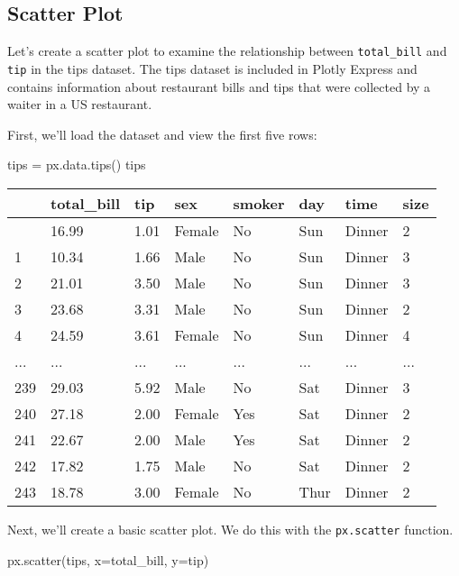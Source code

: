 \documentclass[
  letterpaper,
  DIV=11,
  numbers=noendperiod]{scrreprt}
\newenvironment{Shaded}{\begin{snugshade}}{\end{snugshade}}
\newcommand{\NormalTok}[1]{\textcolor[rgb]{0.00,0.23,0.31}{#1}}
\newcommand{\OperatorTok}[1]{\textcolor[rgb]{0.37,0.37,0.37}{#1}}
\newcommand{\StringTok}[1]{\textcolor[rgb]{0.13,0.47,0.30}{#1}}
\begin{document}
\subsection{Scatter Plot}\label{scatter-plot}

Let's create a scatter plot to examine the relationship between
\texttt{total\_bill} and \texttt{tip} in the tips dataset. The tips
dataset is included in Plotly Express and contains information about
restaurant bills and tips that were collected by a waiter in a US
restaurant.

First, we'll load the dataset and view the first five rows:

\begin{Shaded}
\begin{Highlighting}[]
\NormalTok{tips }\OperatorTok{=}\NormalTok{ px.data.tips()}
\NormalTok{tips}
\end{Highlighting}
\end{Shaded}

\begin{longtable}[]{@{}llllllll@{}}
\toprule\noalign{}
& total\_bill & tip & sex & smoker & day & time & size \\
\midrule\noalign{}
\endhead
\bottomrule\noalign{}
\endlastfoot
0 & 16.99 & 1.01 & Female & No & Sun & Dinner & 2 \\
1 & 10.34 & 1.66 & Male & No & Sun & Dinner & 3 \\
2 & 21.01 & 3.50 & Male & No & Sun & Dinner & 3 \\
3 & 23.68 & 3.31 & Male & No & Sun & Dinner & 2 \\
4 & 24.59 & 3.61 & Female & No & Sun & Dinner & 4 \\
... & ... & ... & ... & ... & ... & ... & ... \\
239 & 29.03 & 5.92 & Male & No & Sat & Dinner & 3 \\
240 & 27.18 & 2.00 & Female & Yes & Sat & Dinner & 2 \\
241 & 22.67 & 2.00 & Male & Yes & Sat & Dinner & 2 \\
242 & 17.82 & 1.75 & Male & No & Sat & Dinner & 2 \\
243 & 18.78 & 3.00 & Female & No & Thur & Dinner & 2 \\
\end{longtable}

Next, we'll create a basic scatter plot. We do this with the
\texttt{px.scatter} function.

\begin{Shaded}
\begin{Highlighting}[]
\NormalTok{px.scatter(tips, x}\OperatorTok{=}\StringTok{\textquotesingle{}total\_bill\textquotesingle{}}\NormalTok{, y}\OperatorTok{=}\StringTok{\textquotesingle{}tip\textquotesingle{}}\NormalTok{)}
\end{Highlighting}
\end{Shaded}
\end{document}
